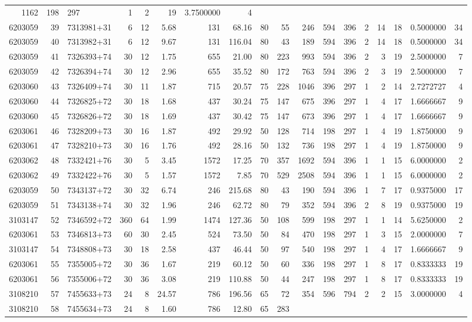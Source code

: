 \documentclass[
]{article}
\begin{document}
\begin{longtable}[]{@{}rrlrrrrrrrrrrrrrrr@{}}
1162 & 198 & 297 & 1 & 2 & 19 & 3.7500000 & 4\tabularnewline
6203059 & 39 & 7313981+31 & 6 & 12 & 5.68 & 131 & 68.16 & 80 & 55 & 246
& 594 & 396 & 2 & 14 & 18 & 0.5000000 & 34\tabularnewline
6203059 & 40 & 7313982+31 & 6 & 12 & 9.67 & 131 & 116.04 & 80 & 43 & 189
& 594 & 396 & 2 & 14 & 18 & 0.5000000 & 34\tabularnewline
6203059 & 41 & 7326393+74 & 30 & 12 & 1.75 & 655 & 21.00 & 80 & 223 &
993 & 594 & 396 & 2 & 3 & 19 & 2.5000000 & 7\tabularnewline
6203059 & 42 & 7326394+74 & 30 & 12 & 2.96 & 655 & 35.52 & 80 & 172 &
763 & 594 & 396 & 2 & 3 & 19 & 2.5000000 & 7\tabularnewline
6203060 & 43 & 7326409+74 & 30 & 11 & 1.87 & 715 & 20.57 & 75 & 228 &
1046 & 396 & 297 & 1 & 2 & 14 & 2.7272727 & 4\tabularnewline
6203060 & 44 & 7326825+72 & 30 & 18 & 1.68 & 437 & 30.24 & 75 & 147 &
675 & 396 & 297 & 1 & 4 & 17 & 1.6666667 & 9\tabularnewline
6203060 & 45 & 7326826+72 & 30 & 18 & 1.69 & 437 & 30.42 & 75 & 147 &
673 & 396 & 297 & 1 & 4 & 17 & 1.6666667 & 9\tabularnewline
6203061 & 46 & 7328209+73 & 30 & 16 & 1.87 & 492 & 29.92 & 50 & 128 &
714 & 198 & 297 & 1 & 4 & 19 & 1.8750000 & 9\tabularnewline
6203061 & 47 & 7328210+73 & 30 & 16 & 1.76 & 492 & 28.16 & 50 & 132 &
736 & 198 & 297 & 1 & 4 & 19 & 1.8750000 & 9\tabularnewline
6203062 & 48 & 7332421+76 & 30 & 5 & 3.45 & 1572 & 17.25 & 70 & 357 &
1692 & 594 & 396 & 1 & 1 & 15 & 6.0000000 & 2\tabularnewline
6203062 & 49 & 7332422+76 & 30 & 5 & 1.57 & 1572 & 7.85 & 70 & 529 &
2508 & 594 & 396 & 1 & 1 & 15 & 6.0000000 & 2\tabularnewline
6203059 & 50 & 7343137+72 & 30 & 32 & 6.74 & 246 & 215.68 & 80 & 43 &
190 & 594 & 396 & 1 & 7 & 17 & 0.9375000 & 17\tabularnewline
6203059 & 51 & 7343138+74 & 30 & 32 & 1.96 & 246 & 62.72 & 80 & 79 & 352
& 594 & 396 & 2 & 8 & 19 & 0.9375000 & 19\tabularnewline
3103147 & 52 & 7346592+72 & 360 & 64 & 1.99 & 1474 & 127.36 & 50 & 108 &
599 & 198 & 297 & 1 & 1 & 14 & 5.6250000 & 2\tabularnewline
6203061 & 53 & 7346813+73 & 60 & 30 & 2.45 & 524 & 73.50 & 50 & 84 & 470
& 198 & 297 & 1 & 3 & 15 & 2.0000000 & 7\tabularnewline
3103147 & 54 & 7348808+73 & 30 & 18 & 2.58 & 437 & 46.44 & 50 & 97 & 540
& 198 & 297 & 1 & 4 & 17 & 1.6666667 & 9\tabularnewline
6203061 & 55 & 7355005+72 & 30 & 36 & 1.67 & 219 & 60.12 & 50 & 60 & 336
& 198 & 297 & 1 & 8 & 17 & 0.8333333 & 19\tabularnewline
6203061 & 56 & 7355006+72 & 30 & 36 & 3.08 & 219 & 110.88 & 50 & 44 &
247 & 198 & 297 & 1 & 8 & 17 & 0.8333333 & 19\tabularnewline
3108210 & 57 & 7455633+73 & 24 & 8 & 24.57 & 786 & 196.56 & 65 & 72 &
354 & 596 & 794 & 2 & 2 & 15 & 3.0000000 & 4\tabularnewline
3108210 & 58 & 7455634+73 & 24 & 8 & 1.60 & 786 & 12.80 & 65 & 283 &

\end{longtable}
\end{document}
